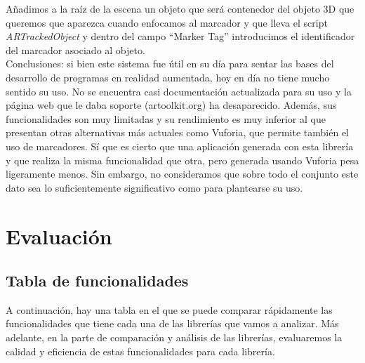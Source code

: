 Añadimos a la raíz de la escena un objeto que será contenedor del objeto 3D que queremos que aparezca cuando enfocamos al marcador y que lleva el script \textit{ARTrackedObject} y dentro del campo ``Marker Tag'' introducimos el identificador del marcador asociado al objeto.\\

Conclusiones: si bien este sistema fue útil en su día para sentar las bases del desarrollo de programas en realidad aumentada, hoy en día no tiene mucho sentido su uso. No se encuentra casi documentación actualizada para su uso y la página web que le daba soporte (artoolkit.org) ha desaparecido. Además, sus funcionalidades son muy limitadas y su rendimiento es muy inferior al que presentan otras alternativas más actuales como Vuforia, que permite también el uso de marcadores. Sí que es cierto que una aplicación generada con esta librería y que realiza la misma funcionalidad que otra, pero generada usando Vuforia pesa ligeramente menos. Sin embargo, no consideramos que sobre todo el conjunto este dato sea lo suficientemente significativo como para plantearse su uso.\\

\clearpage
\section{Evaluación}
\subsection{Tabla de funcionalidades}
A continuación, hay una tabla en el que se puede comparar rápidamente las funcionalidades que tiene cada una de las librerías que vamos a analizar. Más adelante, en la parte de comparación y análisis de las librerías, evaluaremos la calidad y eficiencia de estas funcionalidades para cada librería.

